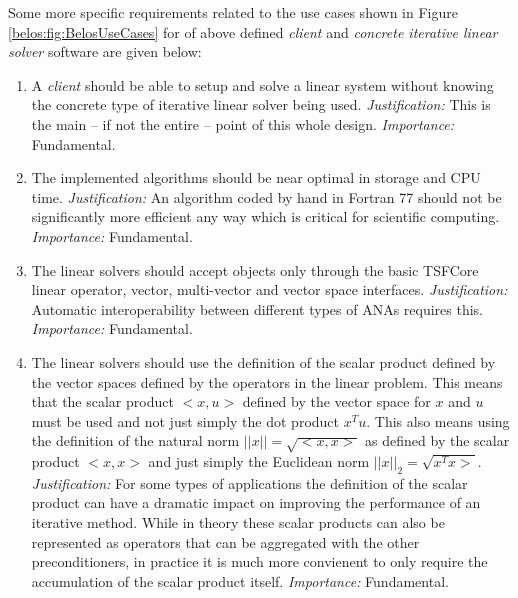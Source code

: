 \documentclass[pdf,ps2pdf,11pt]{SANDreport}
\begin{document}
Some more specific requirements related to the use cases shown in
Figure {}\ref{belos:fig:BelosUseCases} for of above defined
{}\textit{client} and {}\textit{concrete iterative linear solver}
software are given below:

\begin{enumerate}

\item

A {}\textit{client} should be able to setup and solve a linear system
without knowing the concrete type of iterative linear solver being
used.  {}\textit{Justification:} This is the main -- if not the entire
-- point of this whole design.  {}\textit{Importance:} Fundamental.

\item

The implemented algorithms should be near optimal in storage and CPU
time.  {}\textit{Justification:} An algorithm coded by hand in Fortran
77 should not be significantly more efficient any way which is
critical for scientific computing.  {}\textit{Importance:}
Fundamental.

\item

The linear solvers should accept objects only through the basic
TSFCore linear operator, vector, multi-vector and vector space
interfaces.  {}\textit{Justification:} Automatic interoperability
between different types of ANAs requires this.  {}\textit{Importance:}
Fundamental.

\item

The linear solvers should use the definition of the scalar product
defined by the vector spaces defined by the operators in the linear
problem.  This means that the scalar product $<x,u>$ defined by the
vector space for $x$ and $u$ must be used and not just simply the dot
product $x^T u$.  This also means using the definition of the natural
norm $||x|| = {}\sqrt{<x,x>}$ as defined by the scalar product $<x,x>$
and just simply the Euclidean norm $||x||_2 = \sqrt{x^T x>}$.
{}\textit{Justification:} For some types of applications the
definition of the scalar product can have a dramatic impact on
improving the performance of an iterative method.  While in theory
these scalar products can also be represented as operators that can be
aggregated with the other preconditioners, in practice it is much more
convienent to only require the accumulation of the scalar product
itself.  {}\textit{Importance:} Fundamental.


\end{enumerate}
\end{document}
